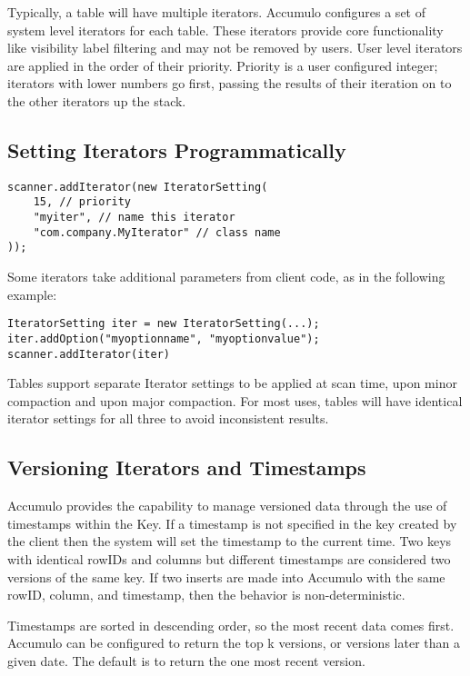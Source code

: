 Typically, a table will have multiple iterators. Accumulo configures a set of
system level iterators for each table. These iterators provide core
functionality like visibility label filtering and may not be removed by
users. User level iterators are applied in the order of their priority.
Priority is a user configured integer; iterators with lower numbers go first,
passing the results of their iteration on to the other iterators up the
stack.

\subsection{Setting Iterators Programmatically}

\begingroup\fontsize{8pt}{8pt}\selectfont\begin{verbatim}
scanner.addIterator(new IteratorSetting(
    15, // priority
    "myiter", // name this iterator
    "com.company.MyIterator" // class name
));
\end{verbatim}\endgroup

Some iterators take additional parameters from client code, as in the following
example:

\begingroup\fontsize{8pt}{8pt}\selectfont\begin{verbatim}
IteratorSetting iter = new IteratorSetting(...);
iter.addOption("myoptionname", "myoptionvalue");
scanner.addIterator(iter)
\end{verbatim}\endgroup

Tables support separate Iterator settings to be applied at scan time, upon minor
compaction and upon major compaction. For most uses, tables will have identical
iterator settings for all three to avoid inconsistent results.

\subsection{Versioning Iterators and Timestamps}

Accumulo provides the capability to manage versioned data through the use of
timestamps within the Key. If a timestamp is not specified in the key created by the
client then the system will set the timestamp to the current time. Two keys with
identical rowIDs and columns but different timestamps are considered two versions
of the same key. If two inserts are made into Accumulo with the same rowID,
column, and timestamp, then the behavior is non-deterministic.

Timestamps are sorted in descending order, so the most recent data comes first.
Accumulo can be configured to return the top k versions, or versions later than a
given date. The default is to return the one most recent version.


